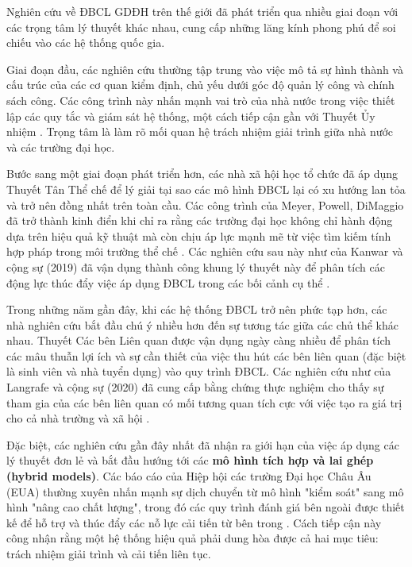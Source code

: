 \documentclass[12pt, a4paper, openany]{report}
\begin{document}
Nghiên cứu về ĐBCL GDĐH trên thế giới đã phát triển qua nhiều giai đoạn với các trọng tâm lý thuyết khác nhau, cung cấp những lăng kính phong phú để soi chiếu vào các hệ thống quốc gia.

Giai đoạn đầu, các nghiên cứu thường tập trung vào việc mô tả sự hình thành và cấu trúc của các cơ quan kiểm định, chủ yếu dưới góc độ quản lý công và chính sách công. Các công trình này nhấn mạnh vai trò của nhà nước trong việc thiết lập các quy tắc và giám sát hệ thống, một cách tiếp cận gần với Thuyết Ủy nhiệm \cite{Kivisto2008, DeBoer2019}. Trọng tâm là làm rõ mối quan hệ trách nhiệm giải trình giữa nhà nước và các trường đại học.

Bước sang một giai đoạn phát triển hơn, các nhà xã hội học tổ chức đã áp dụng Thuyết Tân Thể chế để lý giải tại sao các mô hình ĐBCL lại có xu hướng lan tỏa và trở nên đồng nhất trên toàn cầu. Các công trình của Meyer, Powell, DiMaggio đã trở thành kinh điển khi chỉ ra rằng các trường đại học không chỉ hành động dựa trên hiệu quả kỹ thuật mà còn chịu áp lực mạnh mẽ từ việc tìm kiếm tính hợp pháp trong môi trường thể chế \cite{MeyerPowell2020, DiMaggioPowell1983}. Các nghiên cứu sau này như của Kanwar và cộng sự (2019) đã vận dụng thành công khung lý thuyết này để phân tích các động lực thúc đẩy việc áp dụng ĐBCL trong các bối cảnh cụ thể \cite{Kanwar2019}.

Trong những năm gần đây, khi các hệ thống ĐBCL trở nên phức tạp hơn, các nhà nghiên cứu bắt đầu chú ý nhiều hơn đến sự tương tác giữa các chủ thể khác nhau. Thuyết Các bên Liên quan được vận dụng ngày càng nhiều để phân tích các mâu thuẫn lợi ích và sự cần thiết của việc thu hút các bên liên quan (đặc biệt là sinh viên và nhà tuyển dụng) vào quy trình ĐBCL. Các nghiên cứu như của Langrafe và cộng sự (2020) đã cung cấp bằng chứng thực nghiệm cho thấy sự tham gia của các bên liên quan có mối tương quan tích cực với việc tạo ra giá trị cho cả nhà trường và xã hội \cite{Langrafe2020}.

Đặc biệt, các nghiên cứu gần đây nhất đã nhận ra giới hạn của việc áp dụng các lý thuyết đơn lẻ và bắt đầu hướng tới các \textbf{mô hình tích hợp và lai ghép (hybrid models)}. Các báo cáo của Hiệp hội các trường Đại học Châu Âu (EUA) thường xuyên nhấn mạnh sự dịch chuyển từ mô hình "kiểm soát" sang mô hình "nâng cao chất lượng", trong đó các quy trình đánh giá bên ngoài được thiết kế để hỗ trợ và thúc đẩy các nỗ lực cải tiến từ bên trong \cite{EUA_Integration, HarveyStensaker}. Cách tiếp cận này công nhận rằng một hệ thống hiệu quả phải dung hòa được cả hai mục tiêu: trách nhiệm giải trình và cải tiến liên tục.
\end{document}
